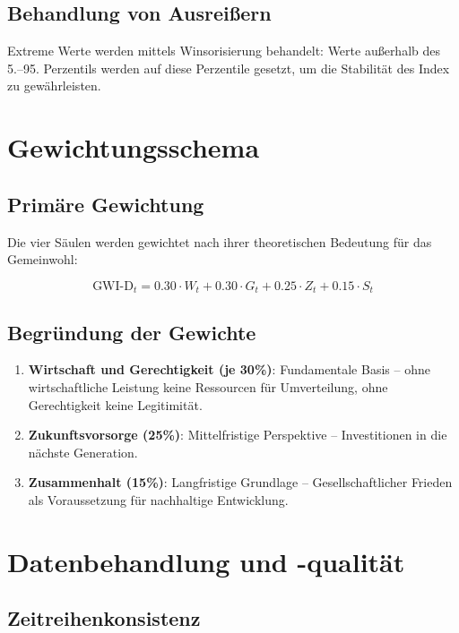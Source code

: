 \subsection{Behandlung von Ausreißern}

Extreme Werte werden mittels Winsorisierung behandelt: Werte außerhalb des 5.--95. Perzentils werden auf diese Perzentile gesetzt, um die Stabilität des Index zu gewährleisten.

\section{Gewichtungsschema}

\subsection{Primäre Gewichtung}

Die vier Säulen werden gewichtet nach ihrer theoretischen Bedeutung für das Gemeinwohl:

\[
\text{GWI-D}_t = 0.30 \cdot W_t + 0.30 \cdot G_t + 0.25 \cdot Z_t + 0.15 \cdot S_t
\]

\subsection{Begründung der Gewichte}

\begin{enumerate}
\item \textbf{Wirtschaft und Gerechtigkeit (je 30\%)}: Fundamentale Basis -- ohne wirtschaftliche Leistung keine Ressourcen für Umverteilung, ohne Gerechtigkeit keine Legitimität.

\item \textbf{Zukunftsvorsorge (25\%)}: Mittelfristige Perspektive -- Investitionen in die nächste Generation.

\item \textbf{Zusammenhalt (15\%)}: Langfristige Grundlage -- Gesellschaftlicher Frieden als Voraussetzung für nachhaltige Entwicklung.
\end{enumerate}

\section{Datenbehandlung und -qualität}

\subsection{Zeitreihenkonsistenz}

